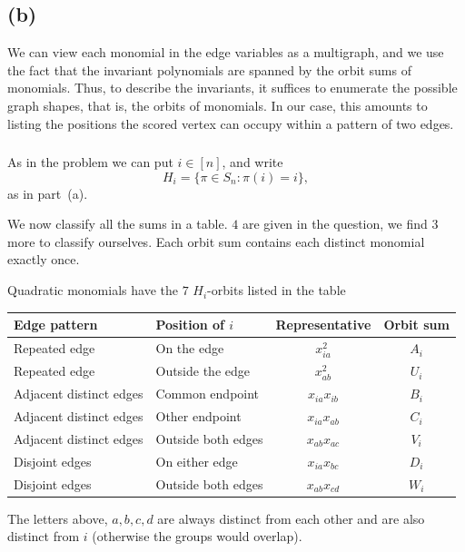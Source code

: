 \documentclass[11pt]{scrartcl}
\begin{document}
\subsection{(b)}

\begin{soln}
We can view each monomial
in the edge variables as a multigraph, and we use the fact that the
invariant polynomials are spanned by the orbit sums of monomials. Thus,
to describe the invariants, it suffices to enumerate the possible graph
shapes, that is, the orbits of monomials. In our case, this amounts to
listing the positions the scored vertex can occupy within a pattern of
two edges.
    \subsubsection*{}

    As in the problem we can put $i\in[n]$, and write
    \[
    H_i=\{\pi\in S_n:\pi(i)=i\},
    \]
    as in part~(a).

	We now classify all the sums in a table. $4$ are given in the 
	question, we find $3$ more to classify ourselves.
    Each orbit sum contains each distinct monomial exactly once.

    \begin{claim*}
        Quadratic monomials have the $7$ $H_i$-orbits listed in the 
		table
        \begin{center}
            \begingroup
            \small
            \renewcommand{\arraystretch}{1.25}
            \begin{tabular}{@{}llcc@{}}
                \hline
                Edge pattern & Position of $i$
                & Representative & Orbit sum\\
                \hline
                Repeated edge & On the edge
                & $x_{ia}^{2}$ & $A_i$\\
                Repeated edge & Outside the edge
                & $x_{ab}^{2}$ & $U_i$\\
                Adjacent distinct edges & Common endpoint
                & $x_{ia}x_{ib}$ & $B_i$\\
                Adjacent distinct edges & Other endpoint
                & $x_{ia}x_{ab}$ & $C_i$\\
                Adjacent distinct edges & Outside both edges
                & $x_{ab}x_{ac}$ & $V_i$\\
                Disjoint edges & On either edge
                & $x_{ia}x_{bc}$ & $D_i$\\
                Disjoint edges & Outside both edges
                & $x_{ab}x_{cd}$ & $W_i$\\
                \hline
            \end{tabular}
            \endgroup
        \end{center}
		The letters above, $a,b,c,d$ are always distinct
		from each other and are also distinct from $i$ (otherwise 
		the groups would overlap).
    \end{claim*}


\end{soln}
\end{document}
